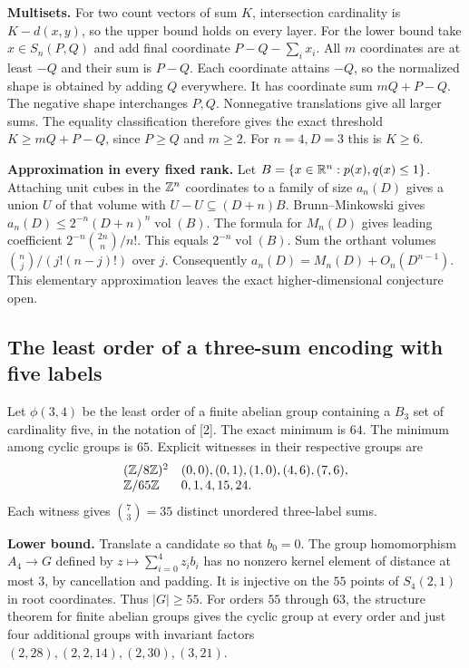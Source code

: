 \textbf{Multisets.} For two count vectors of sum $K$, intersection
cardinality is $K-d(x,y)$, so the upper bound holds on every layer.
For the lower bound take $x\in S_n(P,Q)$ and add final coordinate
$P-Q-\sum_i x_i$. All $m$ coordinates are at least $-Q$ and their sum is
$P-Q$. Each coordinate attains $-Q$, so the normalized shape is obtained by
adding $Q$ everywhere. It has coordinate sum $mQ+P-Q$. The negative
shape interchanges $P,Q$. Nonnegative translations give all larger sums.
The equality classification therefore gives the exact threshold
$K\ge mQ+P-Q$, since $P\ge Q$ and $m\ge2$. For $n=4,D=3$ this is $K\ge6$.

\textbf{Approximation in every fixed rank.}
Let $B=\{x\in\mathbb R^n:p(x),q(x)\le1\}$. Attaching unit cubes in the
$\mathbb Z^n$ coordinates to a family of size $a_n(D)$ gives a union $U$ of
that volume with $U-U\subseteq(D+n)B$. Brunn--Minkowski gives
$a_n(D)\le2^{-n}(D+n)^n\operatorname{vol}(B)$.
The formula for $M_n(D)$ gives leading coefficient
$2^{-n}{2n\choose n}/n!$. This equals $2^{-n}\operatorname{vol}(B)$.
Sum the orthant volumes $\binom nj/(j!(n-j)!)$ over $j$.
Consequently $a_n(D)=M_n(D)+O_n(D^{n-1})$. This elementary
approximation leaves the exact higher-dimensional conjecture open.

\subsection{The least order of a three-sum encoding with five labels}
Let $\phi(3,4)$ be the least order of a finite abelian group containing
a $B_3$ set of cardinality five, in the notation of [2].
The exact minimum is $64$. The minimum among cyclic groups is $65$.
Explicit witnesses in their respective groups are
\[
 \begin{array}{ll}
 (\mathbb Z/8\mathbb Z)^2 & (0,0),(0,1),(1,0),(4,6),(7,6),\\
 \mathbb Z/65\mathbb Z & 0,1,4,15,24.
 \end{array}
\]
Each witness gives $\binom{7}{3}=35$ distinct unordered three-label sums.

\textbf{Lower bound.} Translate a candidate so that $b_0=0$. The group
homomorphism $A_4\to G$ defined by $z\mapsto\sum_{i=0}^4z_i b_i$ has
no nonzero kernel element of distance at most $3$, by cancellation and
padding. It is injective on the $55$ points of $S_4(2,1)$ in root
coordinates. Thus $|G|\ge55$. For orders $55$ through $63$, the structure
theorem for finite abelian groups gives the cyclic group at every order
and just four additional groups with invariant factors
$(2,28),(2,2,14),(2,30),(3,21)$.

